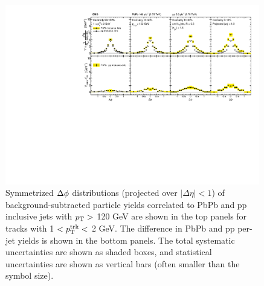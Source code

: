 \begin{figure}[hbt] 
\begin{center} 
\includegraphics[width=0.99\textwidth]{figures/Results/PAS_Figure_4_TrkPt1_TrkPt2.pdf}
\caption[Inclusive jet $\Delta\phi$ correlations for tracks with $1 < p_{\rm T}^{\rm trk} < 2$ GeV at 2.76 TeV]{Symmetrized $\protect\Delta\phi$ distributions  (projected over $|\Delta\eta| < 1$) of background-subtracted particle yields correlated to PbPb and pp inclusive jets with $p_{\rm T} >$ 120 GeV are shown in the top panels for tracks with 1 $ < p_{\rm T}^{\rm trk} < $ 2 GeV.  The difference in PbPb and pp per-jet yields is shown in the bottom panels. The total systematic uncertainties are shown as shaded boxes, and statistical uncertainties are shown as vertical bars (often smaller than the symbol size).}
\label{fig:Inclusive_dPhi1} 
\end{center} 
\end{figure} 



